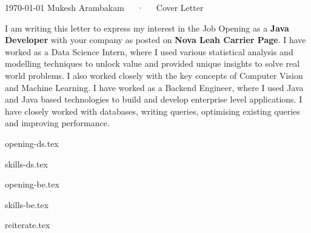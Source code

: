 \documentclass[11pt, a4paper]{awesome-cv}
\newcommand*{\sectiondir}{coverletter/}
\newcommand{\role}{Java Developer}
\newcommand{\type}{Job Opening}
\newcommand{\postedloc}{Nova Leah Carrier Page}
\newcounter{ds_or_be}
\begin{document}
\makecvheader[R]

\makecvfooter
  {\today}
  {Mukesh Arambakam~~~·~~~Cover Letter}
  {}

\makelettertitle

\begin{cvletter}

I am writing this letter to express my interest in the {\type} as a \textbf{\role} with your company as posted on \textbf{\postedloc}.
{
    I have worked as a Data Science Intern, where I used various statistical analysis and modelling techniques to unlock value and provided unique insights to solve real world problems. I also worked closely with the key concepts of Computer Vision and Machine Learning.
}
{
    I have worked as a Backend Engineer, where I used Java and Java based technologies to build and develop enterprise level applications. I have closely worked with databases, writing queries, optimising existing queries and improving performance. 
}

{
    {opening-ds.tex}
    
    {skills-ds.tex}
}
{
    {opening-be.tex}
    
    {skills-be.tex}
}

{reiterate.tex}




\end{cvletter}


\makeletterclosing
\end{document}
